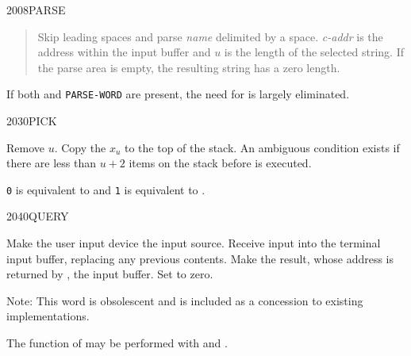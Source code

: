 \begin{newword}{2008}{PARSE}
\begin{rationale}
\begin{enumerate}
\begin{quote}
				Skip leading spaces and parse \emph{name} delimited by
				a space. \emph{c-addr} is the address within the input
				buffer and $u$ is the length of the selected string.
				If the parse area is empty, the resulting string has a
				zero length.
			\end{quote}

			If both  and \texttt{PARSE-WORD} are present,
			the need for  is largely eliminated.
		\end{enumerate}
	\end{rationale}
\end{newword}


\begin{newword}{2030}{PICK}

	Remove $u$. Copy the $x_u$ to the top of the stack. An ambiguous
	condition exists if there are less than $u+2$ items on the stack
	before  is executed.

	\begin{rationale} %
		\texttt{0}  is equivalent to  and
		\texttt{1}  is equivalent to .
	\end{rationale}
\end{newword}


\begin{newword}{2040}{QUERY}
	\stack{}{}

	Make the user input device the input source. Receive input into
	the terminal input buffer, replacing any previous contents. Make
	the result, whose address is returned by , the input
	buffer. Set  to zero.

\item[Note:]
	This word is obsolescent and is included as a concession to
	existing implementations.

	\begin{rationale} %
		The function of  may be performed with 
		and .
	\end{rationale}
\end{newword}


